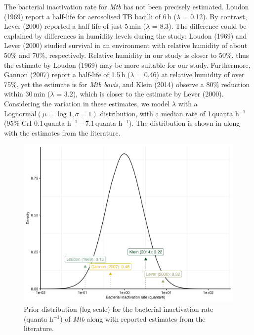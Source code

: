\documentclass[fleqn,11pt]{wlscirep_supp}
\begin{document}
The bacterial inactivation rate for \emph{Mtb} has not been precisely estimated. Loudon (1969)\cite{Loudon1969AMRRD} report a half-life for aerosolised TB bacilli of 6\,h ($\lambda$ = 0.12). By contrast, Lever (2000)\cite{Lever2000LettersAppliedMicrobio} reported a half-life of just 5\,min ($\lambda$ = 8.3). The difference could be explained by differences in humidity levels during the study\cite{Lever2000LettersAppliedMicrobio}: Loudon (1969) and Lever (2000) studied survival in an environment with relative humidity of about 50\% and 70\%, respectively. Relative humidity in our study is closer to 50\%, thus the estimate by Loudon (1969) may be more suitable for our study. Furthermore, Gannon (2007)\cite{Gannon2007ResVetSci} report a half-life of 1.5\,h ($\lambda$ = 0.46) at relative humidity of over 75\%, yet the estimate is for \emph{Mtb bovis}, and Klein (2014)\cite{Klein2014IJMyco} observe a 80\% reduction within 30\,min ($\lambda$ = 3.2), which is closer to the estimate by Lever (2000). Considering the variation in these estimates, we model $\lambda$ with a $\mathrm{Lognormal}(\mu = \log 1, \sigma = 1)$ distribution, with a median rate of 1\,quanta h$^{-1}$ (95\%-CrI 0.1\,quanta h$^{-1}$\,$-$\,7.1\,quanta h$^{-1}$). The distribution is shown in  along with the estimates from the literature.

\begin{figure}[!htpb]
    \centering
    \includegraphics{results/inputs/bacterial-inactivation-rate.png}
    \caption[Prior distribution for the bacterial inactivation rate]{Prior distribution (log scale) for the bacterial inactivation rate (quanta h$^{-1}$) of \emph{Mtb} along with reported estimates from the literature\cite{Loudon1969AMRRD,Gannon2007ResVetSci,Klein2014IJMyco,Lever2000LettersAppliedMicrobio}.}
    \label{fig:lambda-distribution}
\end{figure}
\end{document}
